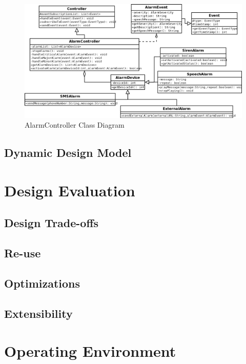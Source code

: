 \documentclass{report}
\begin{document}
\begin{landscape}
\begin{figure}
    \caption{AlarmController Class Diagram}
    \label{fig:alarm_controller_class_diagram}
    \includegraphics[scale=0.5]{alarm_controller_class_diagram.png}
\end{figure}
\end{landscape}

\section{Dynamic Design Model}

\chapter{Design Evaluation} %
\label{ch:design-evaluation}

\section{Design Trade-offs}

\section{Re-use}

\section{Optimizations}

\section{Extensibility}

\chapter{Operating Environment} %
\label{ch:operating-environment}
\end{document}
